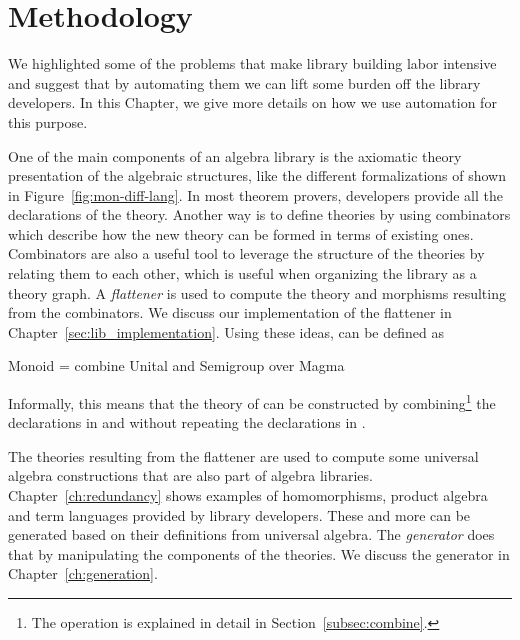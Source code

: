 \chapter{Methodology}
\label{ch:design}

We highlighted some of the problems that make library building labor intensive and suggest that by automating them we can lift some burden off the library developers. In this Chapter, we give more details on how we use automation for this purpose. 

One of the main components of an algebra library is the axiomatic theory presentation of the algebraic structures, like the different formalizations of  shown in Figure~\ref{fig:mon-diff-lang}. In most theorem provers, developers provide all the declarations of the theory. Another way is to define theories by using combinators which describe how the new theory can be formed in terms of existing ones. 
Combinators are also a useful tool to leverage the structure of the theories by relating them to each other, which is useful when organizing the library as a theory graph. A \emph{flattener} is used to compute the theory and morphisms resulting from the combinators. We discuss our implementation of the flattener in Chapter~\ref{sec:lib_implementation}. Using these ideas,  can be defined as 
\begin{togcode} 
Monoid = combine Unital and Semigroup over Magma
\end{togcode} 
Informally, this means that the theory of  can be constructed by combining\footnote{The  operation is explained in detail in Section~\ref{subsec:combine}.} the declarations in   and  without repeating the declarations in . 

The theories resulting from the flattener are used to compute some universal algebra constructions that are also part of algebra libraries. Chapter~\ref{ch:redundancy} shows examples of homomorphisms, product algebra and term languages provided by library developers. These and more can be generated based on their definitions from universal algebra. The \emph{generator} does that by manipulating the  components of the theories. We discuss the generator in Chapter~\ref{ch:generation}. 

